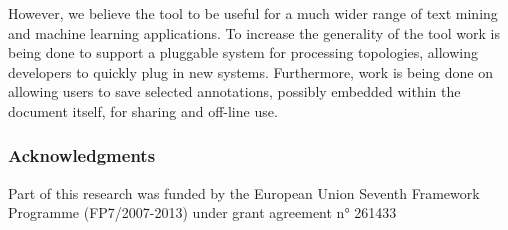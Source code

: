 \documentclass[runningheads,a4paper]{llncs}
\begin{document}
However, we believe the tool to be useful for a much wider range of text mining and machine learning applications.
To increase the generality of the tool work is being done to support a pluggable system for processing topologies, allowing developers to quickly plug in new systems.
Furthermore, work is being done on allowing users to save selected annotations, possibly embedded within the document itself, for sharing and off-line use.

\subsubsection{Acknowledgments}
Part of this research was funded by the European Union Seventh Framework Programme (FP7/2007-2013) under grant agreement n° 261433



\end{document}
